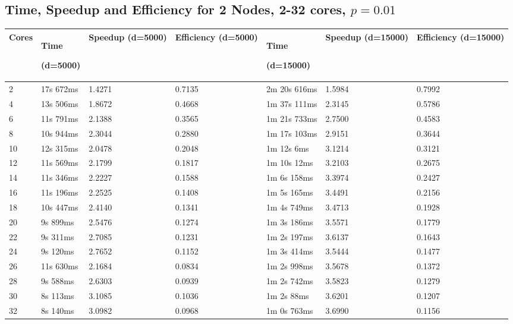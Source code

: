 \documentclass[12pt]{article}
\begin{document}
\begin{appendices}
\vspace{-0.5cm}\subsection{Time, Speedup and Efficiency for 2 Nodes, 2-32 cores, $p=0.01$}\vspace{-0.5cm}
\footnotesize{\label{sec:twoNodes}
\begin{center}
\begin{tabular}{|p{1cm}|p{2.5cm}|p{2cm}|p{2cm}|p{2.5cm}|p{2cm}|p{2cm}|}
\hline
Cores	& Time\par(d=5000)	& Speedup (d=5000)	& Efficiency (d=5000)	& Time \par(d=15000)	& Speedup (d=15000)	& Efficiency (d=15000)  \\
\hline
2 & 17s 672ms & 1.4271 & 0.7135 & 2m 20s 616ms & 1.5984 & 0.7992 \\
4 & 13s 506ms & 1.8672 & 0.4668 & 1m 37s 111ms & 2.3145 & 0.5786 \\
6 & 11s 791ms & 2.1388 & 0.3565 & 1m 21s 733ms & 2.7500 & 0.4583 \\
8 & 10s 944ms & 2.3044 & 0.2880 & 1m 17s 103ms & 2.9151 & 0.3644 \\
10 & 12s 315ms & 2.0478 & 0.2048 & 1m 12s 6ms & 3.1214 & 0.3121 \\
12 & 11s 569ms & 2.1799 & 0.1817 & 1m 10s 12ms & 3.2103 & 0.2675 \\
14 & 11s 346ms & 2.2227 & 0.1588 & 1m 6s 158ms & 3.3974 & 0.2427 \\
16 & 11s 196ms & 2.2525 & 0.1408 & 1m 5s 165ms & 3.4491 & 0.2156 \\
18 & 10s 447ms & 2.4140 & 0.1341 & 1m 4s 749ms & 3.4713 & 0.1928 \\
20 & 9s 899ms & 2.5476 & 0.1274 & 1m 3s 186ms & 3.5571 & 0.1779 \\
22 & 9s 311ms & 2.7085 & 0.1231 & 1m 2s 197ms & 3.6137 & 0.1643 \\
24 & 9s 120ms & 2.7652 & 0.1152 & 1m 3s 414ms & 3.5444 & 0.1477 \\
26 & 11s 630ms & 2.1684 & 0.0834 & 1m 2s 998ms & 3.5678 & 0.1372 \\
28 & 9s 588ms & 2.6303 & 0.0939 & 1m 2s 742ms & 3.5823 & 0.1279 \\
30 & 8s 113ms & 3.1085 & 0.1036 & 1m 2s 88ms & 3.6201 & 0.1207 \\
32 & 8s 140ms & 3.0982 & 0.0968 & 1m 0s 763ms & 3.6990 & 0.1156 \\
\hline
\end{tabular}
\end{center}}


\end{appendices}
\end{document}
